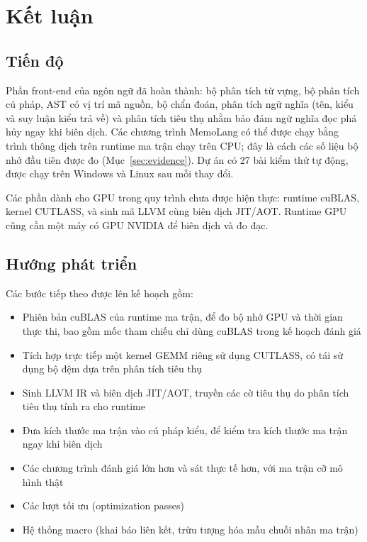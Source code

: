 \documentclass[a4paper]{article}
\begin{document}
	\section{Kết luận}
	
	\subsection{Tiến độ}
	Phần front-end của ngôn ngữ đã hoàn thành: bộ phân tích từ vựng, bộ phân tích cú pháp, AST có vị trí mã nguồn, bộ chẩn đoán, phân tích ngữ nghĩa (tên, kiểu và suy luận kiểu trả về) và phân tích tiêu thụ nhằm bảo đảm ngữ nghĩa đọc phá hủy ngay khi biên dịch. Các chương trình MemoLang có thể được chạy bằng trình thông dịch trên runtime ma trận chạy trên CPU; đây là cách các số liệu bộ nhớ đầu tiên được đo (Mục~\ref{sec:evidence}). Dự án có 27 bài kiểm thử tự động, được chạy trên Windows và Linux sau mỗi thay đổi.

	Các phần dành cho GPU trong quy trình chưa được hiện thực: runtime cuBLAS, kernel CUTLASS, và sinh mã LLVM cùng biên dịch JIT/AOT. Runtime GPU cũng cần một máy có GPU NVIDIA để biên dịch và đo đạc.

	\subsection{Hướng phát triển}
	Các bước tiếp theo được lên kế hoạch gồm:
	\begin{itemize}
		\item Phiên bản cuBLAS của runtime ma trận, để đo bộ nhớ GPU và thời gian thực thi, bao gồm mốc tham chiếu chỉ dùng cuBLAS trong kế hoạch đánh giá
		\item Tích hợp trực tiếp một kernel GEMM riêng sử dụng CUTLASS, có tái sử dụng bộ đệm dựa trên phân tích tiêu thụ
		\item Sinh LLVM IR và biên dịch JIT/AOT, truyền các cờ tiêu thụ do phân tích tiêu thụ tính ra cho runtime
		\item Đưa kích thước ma trận vào cú pháp kiểu, để kiểm tra kích thước ma trận ngay khi biên dịch
		\item Các chương trình đánh giá lớn hơn và sát thực tế hơn, với ma trận cỡ mô hình thật
		\item Các lượt tối ưu (optimization passes)
		\item Hệ thống macro (khai báo liên kết, trừu tượng hóa mẫu chuỗi nhân ma trận)
	\end{itemize}
\end{document}
